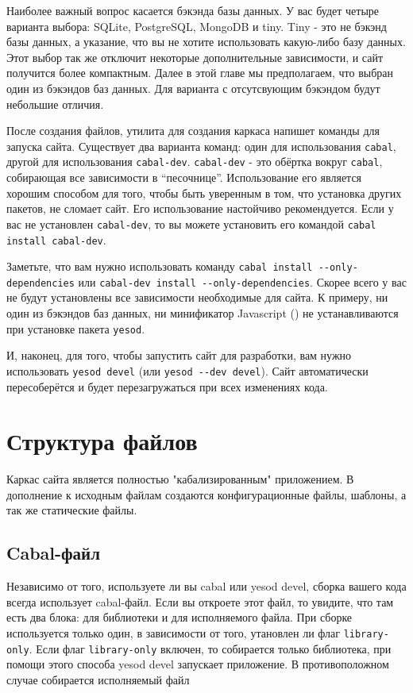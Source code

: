 Наиболее важный вопрос касается бэкэнда базы данных. У вас будет четыре варианта 
выбора: SQLite, PostgreSQL, MongoDB и tiny. 
Tiny - это не бэкэнд базы данных, а указание, что вы не хотите использовать
какую-либо базу данных. Этот выбор так же отключит некоторые дополнительные
зависимости, и сайт получится более компактным. Далее в этой главе мы предполагаем,
что выбран один из бэкэндов баз данных. Для варианта с отсутсвующим бэкэндом
будут небольшие отличия.

После создания файлов, утилита для создания каркаса напишет команды для запуска сайта.
Существует два варианта команд: один для использования \lstinline!cabal!,
другой для использования \lstinline!cabal-dev!. \lstinline!cabal-dev! - это обёртка
вокруг \lstinline!cabal!, собирающая все зависимости в ``песочнице''. Использование
его является хорошим способом для того, чтобы быть уверенным в том, что установка
других пакетов, не сломает сайт. Его использование настойчиво рекомендуется.
Если у вас не установлен \lstinline!cabal-dev!, то вы можете установить его командой
\lstinline!cabal install cabal-dev!.

Заметьте, что вам нужно использовать команду \lstinline!cabal install --only-dependencies! 
или \lstinline!cabal-dev install --only-dependencies!. Скорее всего у вас не будут
установлены все зависимости необходимые для сайта. К примеру, ни один из бэкэндов
баз данных, ни минификатор Javascript ()
не устанавливаются при установке пакета \lstinline!yesod!.

И, наконец, для того, чтобы запустить сайт для разработки, вам нужно использовать
\lstinline!yesod devel! (или \lstinline!yesod --dev devel!). Сайт автоматически
пересоберётся и будет перезагружаться при всех изменениях кода.

\section{Структура файлов}

Каркас сайта является полностью "кабализированным" приложением. В дополнение
к исходным файлам создаются конфигурационные файлы, шаблоны, а так же статические файлы.

\subsection{Cabal-файл}

Независимо от того, используете ли вы cabal или yesod devel, сборка вашего кода всегда 
использует cabal-файл. Если вы откроете этот файл, то увидите, что там есть два блока: для
библиотеки и для исполняемого файла. При сборке используется только один, в зависимости
от того, утановлен ли флаг \lstinline!library-only!. Если флаг \lstinline!library-only! включен,
то собирается только библиотека, при помощи этого способа yesod devel запускает приложение.
В противоположном случае собирается исполняемый файл

